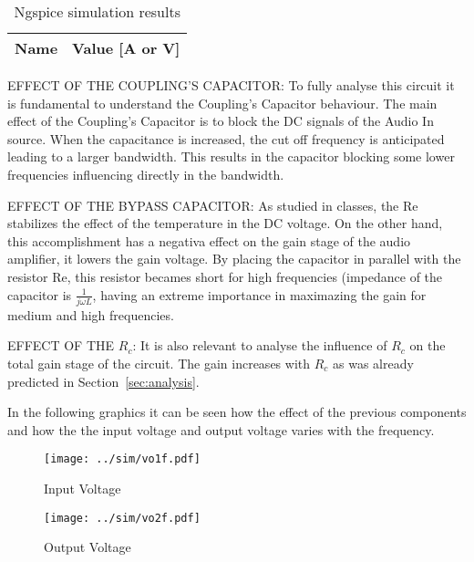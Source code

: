 \begin{table}[!ht]
  \centering
  \begin{tabular}{|l|r|}
    \hline    
    {\bf Name} & {\bf Value [A or V]} \\ \hline
    
  \end{tabular}
  \caption{Ngspice simulation results}
  \label{tab:ng4}
\end{table}

\par EFFECT OF THE COUPLING'S CAPACITOR: To fully analyse this circuit it is fundamental to understand the Coupling's Capacitor behaviour. The main effect of the Coupling's Capacitor is to block the DC signals of the Audio In source. When the capacitance is increased, the cut off frequency is anticipated leading to a larger bandwidth. This results in the capacitor blocking some lower frequencies influencing directly in the bandwidth.

\par EFFECT OF THE BYPASS CAPACITOR: As studied in classes, the Re stabilizes the effect of the temperature in the DC voltage. On the other hand, this accomplishment has a negativa effect on the gain stage of the audio amplifier, it lowers the gain voltage. By placing the capacitor in parallel with the resistor Re, this resistor becames short for high frequencies (impedance of the capacitor is $\frac{1}{j\omega L}$, having an extreme importance in maximazing the gain for medium and high frequencies.

\par EFFECT OF THE $R_c$: It is also relevant to analyse the influence of $R_c$ on the total gain stage of the circuit. The gain increases with $R_c$ as was already predicted in Section~\ref{sec:analysis}.

\par In the following graphics it can be seen how the effect of the previous components and how the the input voltage and output voltage varies with the frequency.

\begin{figure}[ht!] \centering
\texttt{[image: ../sim/vo1f.pdf]}
\caption{Input Voltage} 
\label{fig:sim1}
\end{figure}

\begin{figure}[ht!] \centering
\texttt{[image: ../sim/vo2f.pdf]}
\caption{Output Voltage} 
\label{fig:sim2}
\end{figure}

